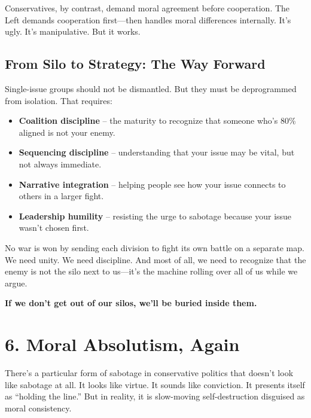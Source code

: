 Conservatives, by contrast, demand moral agreement before cooperation. The Left demands cooperation first—then handles moral differences internally. It’s ugly. It’s manipulative. But it works.

\subsection*{From Silo to Strategy: The Way Forward}

Single-issue groups should not be dismantled. But they must be deprogrammed from isolation. That requires:
\begin{itemize}
    \item \textbf{Coalition discipline} – the maturity to recognize that someone who’s 80\% aligned is not your enemy.
    \item \textbf{Sequencing discipline} – understanding that your issue may be vital, but not always immediate.
    \item \textbf{Narrative integration} – helping people see how your issue connects to others in a larger fight.
    \item \textbf{Leadership humility} – resisting the urge to sabotage because your issue wasn’t chosen first.
\end{itemize}

No war is won by sending each division to fight its own battle on a separate map. We need unity. We need discipline. And most of all, we need to recognize that the enemy is not the silo next to us—it’s the machine rolling over all of us while we argue.

\textbf{If we don’t get out of our silos, we’ll be buried inside them.}















\section*{6. Moral Absolutism, Again}

There’s a particular form of sabotage in conservative politics that doesn’t look like sabotage at all. It looks like virtue. It sounds like conviction. It presents itself as “holding the line.” But in reality, it is slow-moving self-destruction disguised as moral consistency.

